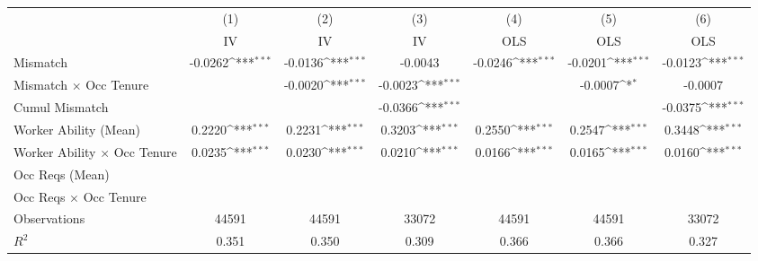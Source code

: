 {
\def\sym#1{\ifmmode^{#1}\else\(^{#1}\)\fi}
\begin{tabular}{l*{6}{c}}
\hline  
                    &\multicolumn{1}{c}{(1)}&\multicolumn{1}{c}{(2)}&\multicolumn{1}{c}{(3)}&\multicolumn{1}{c}{(4)}&\multicolumn{1}{c}{(5)}&\multicolumn{1}{c}{(6)}\\
                    &\multicolumn{1}{c}{IV}&\multicolumn{1}{c}{IV}&\multicolumn{1}{c}{IV}&\multicolumn{1}{c}{OLS}&\multicolumn{1}{c}{OLS}&\multicolumn{1}{c}{OLS}\\
\hline  
Mismatch            &     -0.0262\sym{***}&     -0.0136\sym{***}&     -0.0043         &     -0.0246\sym{***}&     -0.0201\sym{***}&     -0.0123\sym{***}\\
[1em]
Mismatch $\times$ Occ Tenure&                     &     -0.0020\sym{***}&     -0.0023\sym{***}&                     &     -0.0007\sym{*}  &     -0.0007         \\
[1em]
Cumul Mismatch      &                     &                     &     -0.0366\sym{***}&                     &                     &     -0.0375\sym{***}\\
[1em]
Worker Ability (Mean)&      0.2220\sym{***}&      0.2231\sym{***}&      0.3203\sym{***}&      0.2550\sym{***}&      0.2547\sym{***}&      0.3448\sym{***}\\
[1em]
Worker Ability $\times$ Occ Tenure&      0.0235\sym{***}&      0.0230\sym{***}&      0.0210\sym{***}&      0.0166\sym{***}&      0.0165\sym{***}&      0.0160\sym{***}\\
[1em]
Occ Reqs (Mean)     &                     &                     &                     &                     &                     &                     \\
[1em]
Occ Reqs $\times$ Occ Tenure&                     &                     &                     &                     &                     &                     \\
\hline  
Observations        &       44591         &       44591         &       33072         &       44591         &       44591         &       33072         \\
\(R^{2}\)           &       0.351         &       0.350         &       0.309         &       0.366         &       0.366         &       0.327         \\
\hline  
\end{tabular}
}
